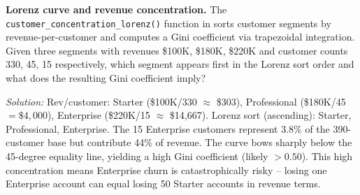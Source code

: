 \begin{challengebox}
\textbf{Lorenz curve and revenue concentration.} The \texttt{customer\_concentration\_lorenz()} function in  sorts customer segments by revenue-per-customer and computes a Gini coefficient via trapezoidal integration. Given three segments with revenues \$100K, \$180K, \$220K and customer counts 330, 45, 15 respectively, which segment appears first in the Lorenz sort order and what does the resulting Gini coefficient imply?

\smallskip
\textit{Solution:} Rev/customer: Starter (\$100K/330 $\approx$ \$303), Professional (\$180K/45 $= \$4{,}000$), Enterprise (\$220K/15 $\approx$ \$14{,}667). Lorenz sort (ascending): Starter, Professional, Enterprise. The 15 Enterprise customers represent 3.8\% of the 390-customer base but contribute 44\% of revenue. The curve bows sharply below the 45-degree equality line, yielding a high Gini coefficient (likely $> 0.50$). This high concentration means Enterprise churn is catastrophically risky -- losing one Enterprise account can equal losing 50 Starter accounts in revenue terms.
\end{challengebox}
